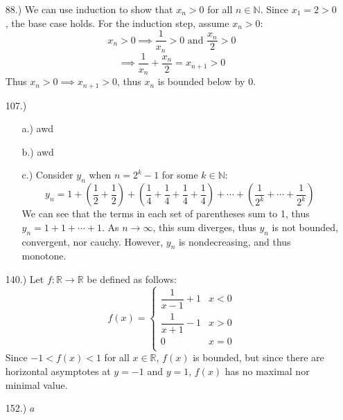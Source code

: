 \documentclass[12pt]{article}
\newcommand{\parns}[1]{\left(#1\right)}
\begin{document}
\pagestyle{fancy}
\fancyhead{}

\normalsize
\begin{itemize}
    \item [88.)] We can use induction to show that $x_n>0$ for all $n\in\mathbb{N}$. Since $x_1=2>0$, the base case holds. For the induction step, assume $x_n>0$:
    \[x_n>0\implies\frac{1}{x_n}>0\text{ and }\frac{x_n}{2}>0\]
    \[\implies\frac{1}{x_n}+\frac{x_n}{2}=x_{n+1}>0\]
    Thus $x_n>0\implies x_{n+1}>0$, thus $x_n$ is bounded below by $0$.

    \item [107.)] \begin{itemize}
        \item [a.)] awd

        \item [b.)] awd

        \item [c.)] Consider $y_n$ when $n=2^{k}-1$ for some $k\in\mathbb{N}$:
        \[y_n=1+\parns{\frac{1}{2}+\frac{1}{2}}+\parns{\frac{1}{4}+\frac{1}{4}+\frac{1}{4}+\frac{1}{4}}+\cdots+\parns{\frac{1}{2^k}+\cdots+\frac{1}{2^k}}\]
        We can see that the terms in each set of parentheses sum to 1, thus $y_n=1+1+\cdots+1$. As $n\to\infty$, this sum diverges, thus $y_n$ is not bounded, convergent, nor cauchy. However, $y_n$ is nondecreasing, and thus monotone.
    \end{itemize}

    \item [140.)] Let $f:\mathbb R\to\mathbb R$ be defined as follows:
    \[f(x)=\begin{cases}
        \dfrac{1}{x-1}+1 & x<0 \\
        \dfrac{1}{x+1}-1 & x>0 \\
        0 & x=0 \\
    \end{cases}\]
    Since $-1<f(x)<1$ for all $x\in\mathbb R$, $f(x)$ is bounded, but since there are horizontal asymptotes at $y=-1$ and $y=1$, $f(x)$ has no maximal nor minimal value.

    \item [152.)] $a$
\end{itemize}
\end{document}

